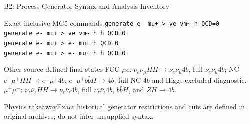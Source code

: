 \documentclass[aspectratio=1610,english]{beamer}
\newcommand{\src}[1]{\vfill{\par\color{black!65}\fontsize{6.4}{7.4}\selectfont\emph{Source:} #1\par}}
\newcommand{\key}[1]{\begin{alertblock}{Physics takeaway}\scriptsize #1\end{alertblock}}
\begin{document}
\begin{frame}[t]{B2: Process Generator Syntax and Analysis Inventory}
\small

\begin{block}{Exact inclusive MG5 commands}
\texttt{generate e- mu+ > ve vm\textasciitilde{} h QCD=0}\\
\texttt{generate e- mu+ > ve vm\textasciitilde{} h h QCD=0}\\
\texttt{generate e- mu+ > e- mu+ h QCD=0}\\
\texttt{generate e- mu+ > e- mu+ h h QCD=0}
\end{block}
\begin{block}{Other source-defined final states}
\scriptsize
FCC-$\mu e$: $\nu_e\bar\nu_\mu HH\to\nu_e\bar\nu_\mu4b$, full $\nu_e\bar\nu_\mu4b$; NC $e^-\mu^+HH\to e^-\mu^+4b$, $e^-\mu^+b\bar bH\to4b$, full NC $4b$ and Higgs-excluded diagnostic.\\
$\mu^+\mu^-$: $\nu_\ell\bar\nu_\ell HH\to\nu_\ell\bar\nu_\ell4b$, full $\nu_\ell\bar\nu_\ell4b$, $b\bar bH$, and $ZH\to4b$.
\end{block}
\key{Exact historical generator restrictions and cuts are defined in original archives; do not infer unsupplied syntax.}

\end{frame}
\end{document}
